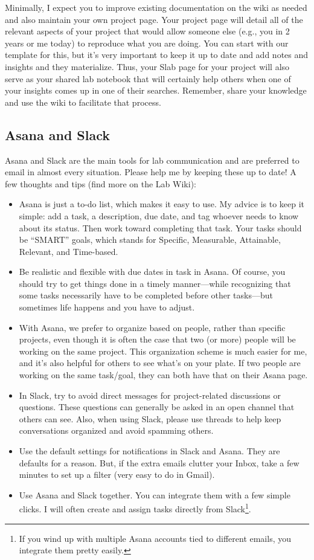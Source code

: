\documentclass[letterpaper,11pt,oneside]{memoir}
\begin{document}
Minimally, I expect you to improve existing documentation on the wiki as needed and also maintain your own project page. Your project page will detail all of the relevant aspects of your project that would allow someone else (e.g., you in 2 years or me today) to reproduce what you are doing. You can start with our template for this, but it's very important to keep it up to date and add notes and insights and they materialize. Thus, your Slab page for your project will also serve as your shared lab notebook that will certainly help others when one of your insights comes up in one of their searches. Remember, share your knowledge and use the wiki to facilitate that process.


\subsection{Asana and Slack}
Asana and Slack are the main tools for lab communication and are preferred to email in almost every situation. Please help me by keeping these up to date! A few thoughts and tips (find more on the Lab Wiki):

\begin{itemize}
\item Asana is just a to-do list, which makes it easy to use. My advice is to keep it simple: add a task, a description, due date, and tag whoever needs to know about its status. Then work toward completing that task. Your tasks should be ``SMART'' goals, which stands for Specific, Measurable, Attainable, Relevant, and Time-based. 
\item Be realistic and flexible with due dates in task in Asana. Of course, you should try to get things done in a timely manner---while recognizing that some tasks necessarily have to be completed before other tasks---but sometimes life happens and you have to adjust.
\item With Asana, we prefer to organize based on people, rather than specific projects, even though it is often the case that two (or more) people will be working on the same project. This organization scheme is much easier for me, and it's also helpful for others to see what's on your plate. If two people are working on the same task/goal, they can both have that on their Asana page.
\item In Slack, try to avoid direct messages for project-related discussions or questions. These questions can generally be asked in an open channel that others can see. Also, when using Slack, please use threads to help keep conversations organized and avoid spamming others.
\item Use the default settings for notifications in Slack and Asana. They are defaults for a reason. But, if the extra emails clutter your Inbox, take a few minutes to set up a filter (very easy to do in Gmail).
\item Use Asana and Slack together. You can integrate them with a few simple clicks. I will often create and assign tasks directly from Slack\footnote{If you wind up with multiple Asana accounts tied to different emails, you integrate them pretty easily.}.
\end{itemize}
\end{document}
